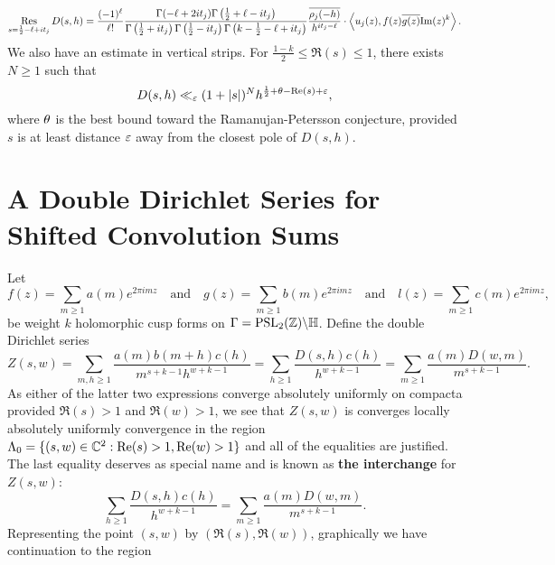 \documentclass[12pt,reqno,oneside]{amsart}
\begin{document}
  \begin{equation}\label{equ:residue_of_shifted_Dirichlet}
    \operatorname*{\mathrm{Res}}_{s = \frac{1}{2}-\ell+it_{j}}D(s,h) = \frac{(-1)^{\ell}}{\ell!}\frac{\Gamma(-\ell+2it_{j})\Gamma\left(\frac{1}{2}+\ell-it_{j}\right)}{\Gamma\left(\frac{1}{2}+it_{j}\right)\Gamma\left(\frac{1}{2}-it_{j}\right)\Gamma\left(k-\frac{1}{2}-\ell+it_{j}\right)}\frac{\overline{\rho_{j}(-h)}}{h^{it_{j}-\ell}} \cdot \left\langle u_{j}(z),f(z)\overline{g(z)}\mathrm{Im}(z)^{k}\right\rangle.
  \end{equation}
  We also have an estimate in vertical strips. For $\frac{1-k}{2} \le \Re(s) \le 1$, there exists $N \ge 1$ such that
  \begin{equation}\label{equ:vertical_bound_shifted_Dirichlet_2}
    D(s,h) \ll_{\varepsilon} (1+|s|)^{N}h^{\frac{1}{2}+\theta-\mathrm{Re}(s)+\varepsilon},
  \end{equation}
  where $\theta$ is the best bound toward the Ramanujan-Petersson conjecture, provided $s$ is at least distance $\varepsilon$ away from the closest pole of $D(s,h)$.
\section*{A Double Dirichlet Series for Shifted Convolution Sums}
  Let
  \[
    f(z) = \sum_{m \ge 1}a(m)e^{2\pi imz} \quad \text{and} \quad g(z) = \sum_{m \ge 1}b(m)e^{2\pi imz} \quad \text{and} \quad l(z) = \sum_{m \ge 1}c(m)e^{2\pi imz},
  \]
  be weight $k$ holomorphic cusp forms on $\Gamma = \mathrm{PSL}_{2}(\mathbb{Z})\backslash\mathbb{H}$. Define the double Dirichlet series
  \[
    Z(s,w) = \sum_{m,h \ge 1}\frac{a(m)b(m+h)c(h)}{m^{s+k-1}h^{w+k-1}} = \sum_{h \ge 1}\frac{D(s,h)c(h)}{h^{w+k-1}} = \sum_{m \ge 1}\frac{a(m)D(w,m)}{m^{s+k-1}}.
  \]
  As either of the latter two expressions converge absolutely uniformly on compacta provided $\Re(s) > 1$ and $\Re(w) > 1$, we see that $Z(s,w)$ is converges locally absolutely uniformly convergence in the region $\Lambda_{0} = \{(s,w) \in \mathbb{C}^{2}:\mathrm{Re}(s) > 1, \mathrm{Re}(w) > 1\}$ and all of the equalities are justified. The last equality deserves as special name and is known as \textbf{the interchange} for $Z(s,w)$:
  \[
    \sum_{h \ge 1}\frac{D(s,h)c(h)}{h^{w+k-1}} = \sum_{m \ge 1}\frac{a(m)D(w,m)}{m^{s+k-1}}.
  \]
  Representing the point $(s,w)$ by $(\Re(s),\Re(w))$, graphically we have continuation to the region

  \begin{center}
  \end{center}
\end{document}

